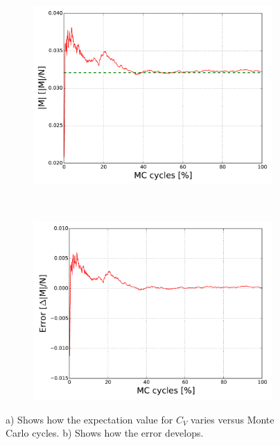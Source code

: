 \begin{figure}[H]
    \centering
    \begin{subfigure}{0.5\textwidth}
        \centering
        \includegraphics[width=\linewidth]{result/bilder/2x2/cv22}
        \caption{}
    \end{subfigure}%
    ~ 
    \begin{subfigure}{0.5\textwidth}
        \centering
        \includegraphics[width=\linewidth]{result/bilder/2x2/cverror22}
        \caption{}
    \end{subfigure}
    \caption{a) Shows how the expectation value for $C_V$ varies versus Monte Carlo cycles. b) Shows how the error develops. }
    \label{fig:22-cv}
\end{figure}

